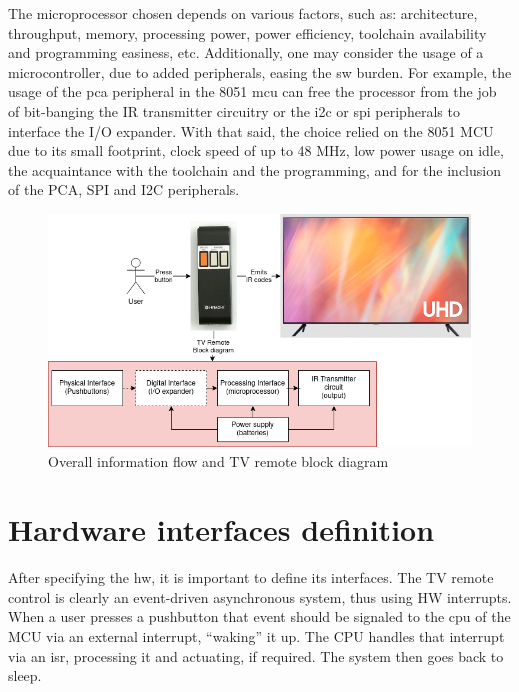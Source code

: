 The microprocessor chosen depends on various factors, such as: architecture,
throughput, memory, processing power, power efficiency, toolchain availability
and programming easiness, etc. Additionally, one may consider the usage of a
microcontroller, due to added peripherals, easing the \gls{sw} burden. For
example, the usage of the \gls{pca} peripheral in the 8051 \gls{mcu} can free the processor from the
job of bit-banging the IR transmitter circuitry or the \gls{i2c} or \gls{spi} peripherals to
interface the I/O expander. With that said, the choice
relied on the 8051 MCU due to its small footprint, clock speed of up to 48 MHz,
low power usage on idle, the acquaintance with the toolchain and the
programming, and for the inclusion of the PCA, SPI and I2C peripherals.  
%
  \vspace{-5mm}
%  
%  
\begin{figure}[htb!]
\centering
    \includegraphics[width=0.7\columnwidth]{./img/block-diagram.png}
  \caption{Overall information flow and TV remote block diagram}%
\label{fig:block-diag}
\end{figure}
%
  \vspace{-5mm}
%  
\section{Hardware interfaces definition}
\label{sec:hw-interf-def}
After specifying the \gls{hw}, it is important to define its interfaces. The
TV remote control is clearly an event-driven asynchronous system, thus using HW
interrupts. When a user presses a pushbutton that event should be signaled to
the \gls{cpu} of the MCU via an external interrupt, ``waking'' it up. The CPU
handles that interrupt via an \gls{isr}, processing it and actuating, if
required. The system then goes back to sleep.

